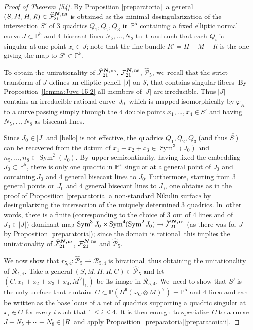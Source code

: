 \documentclass[JEP,XML,SOM,Unicode,NoEqCountersInSection,published]{cedram}
\newcommand{\ns}{{\mkern1mu\mathrm{ns}}}
\newcommand{\bN}{\boldsymbol{N}}
\theoremstyle{plain}
\theoremstyle{definition}
\DeclareMathOperator{\Sym}{Sym}
\newcommand\PP{{\mathbb P}}
\newcommand\F{{\mathcal F}}
\renewcommand\P{{\mathcal P}}
\begin{document}
\begin{proof}[Proof of Theorem \ref{54}]
By Proposition \ref{preparatoria}, a general $(S,M,H,R)\in
\widehat{\F}_{21}^{\bN,\ns}$ is obtained as the minimal desingularization of the intersection $\overline{S'}$ of $3$ quadrics $Q_1,Q_2,Q_3$ in $\PP^5$ containing a fixed elliptic normal curve $J\subset \PP^5$ and $4$ bisecant lines $N_5,\ldots, N_8$ to it and such that each $Q_i$ is singular at one point $x_i\in J$; note that the line bundle $R'=H-M-R$ is the one giving the map to $\overline{S'}\subset\PP^5$.

To obtain the unirationality of $\widehat{\F}_{21}^{\bN,\ns}$, $\F_{21}^{\bN,\ns}$, $\widehat\P_{5}$, we~recall that the strict transform of $J$ defines an elliptic pencil $|J|$ on $S$, that contains singular fibers. By Proposition~\ref{lemma:Juve-15-2} all members of $|J|$ are irreducible. Thus $|J|$ contains an irreducible rational curve~$J_0$, which is mapped isomorphically by $\varphi_{R'}$ to a curve passing simply through the $4$ double points $x_1,\ldots,x_4\in\overline{S'}$ and having $N_5,\ldots, N_8$ as bisecant lines.

Since $J_0\in |J|$ and \eqref{bello} is not effective, the quadrics $Q_1,Q_2,Q_3$ (and thus $\overline{S'}$) can be recovered from the datum of $x_1+x_2+x_3\in \Sym^3(J_0)$ and $n_5,\ldots, n_8\in\Sym^2(J_0)$. By~upper semicontinuity, having fixed the embedding $J_0\subset \PP^5$, there is only one quadric in $\PP^5$ singular at a general point of $J_0$ and containing $J_0$ and $4$ general bisecant lines to $J_0$. Furthermore, starting from $3$ general points on $J_0$ and $4$ general bisecant lines to $J_0$, one obtains as in the proof of Proposition \ref{preparatoria} a
non-standard Nikulin surface by desingularizing the intersection of the uniquely determined $3$ quadrics. In~other words, there is a finite (corresponding to the choice of $3$ out of $4$ lines and of $J_0\in |J|$) dominant map $\Sym^3{J_0}\times \Sym^4(\Sym^2J_0)\to \widehat{\F}_{21}^{\bN,\ns}$ (as there was for $J$ by Proposition \ref{preparatoria}); since the domain is rational, this implies the unirationality of $\widehat{\F}_{21}^{\bN,\ns}$, $\F_{21}^{\bN,\ns}$ and $\widehat\P_{5}$.

We now show that $r_{5,4}:\widehat\P_{5}\to \mathcal R_{5,4}$ is birational, thus obtaining the unirationality of $\mathcal R_{5,4}$. Take a general $(S,M,H,R,C)\in \widehat\P_{5}$ and let $(C,x_1+x_2+x_3+x_4,M^\vee|_C)$ be its image in $\mathcal R_{5,4}$. We~need to show that $\overline{S'}$ is the only surface that contains $C\subset \PP(H^0(\omega_C\otimes M)^\vee)=\mathbb P^5$ and $4$ lines and can be written as the base locus of a net of quadrics supporting a quadric singular at $x_i\in C$ for every $i$ such that $1\leq i\leq 4$. It is then enough to specialize $C$ to a curve $J+N_5+\cdots+N_8\in |R|$ and apply Proposition~\ref{preparatoria}\eqref{preparatoriaii}.
\end{proof}
\end{document}
